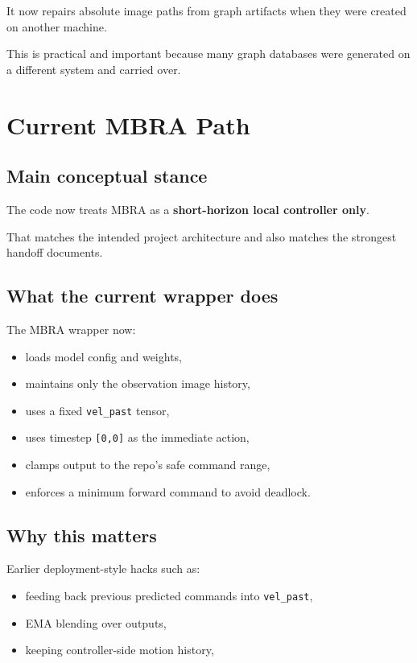 \documentclass[11pt,a4paper]{article}
\begin{document}
It now repairs absolute image paths from graph artifacts when they were created
on another machine.

This is practical and important because many graph databases were generated on a
different system and carried over.


\section{Current MBRA Path}

\subsection{Main conceptual stance}

The code now treats MBRA as a \textbf{short-horizon local controller only}.

That matches the intended project architecture and also matches the strongest
handoff documents.

\subsection{What the current wrapper does}

The MBRA wrapper now:

\begin{itemize}[nosep]
  \item loads model config and weights,
  \item maintains only the observation image history,
  \item uses a fixed \texttt{vel\_past} tensor,
  \item uses timestep \texttt{[0,0]} as the immediate action,
  \item clamps output to the repo's safe command range,
  \item enforces a minimum forward command to avoid deadlock.
\end{itemize}

\subsection{Why this matters}

Earlier deployment-style hacks such as:

\begin{itemize}[nosep]
  \item feeding back previous predicted commands into \texttt{vel\_past},
  \item EMA blending over outputs,
  \item keeping controller-side motion history,
\end{itemize}
\end{document}
